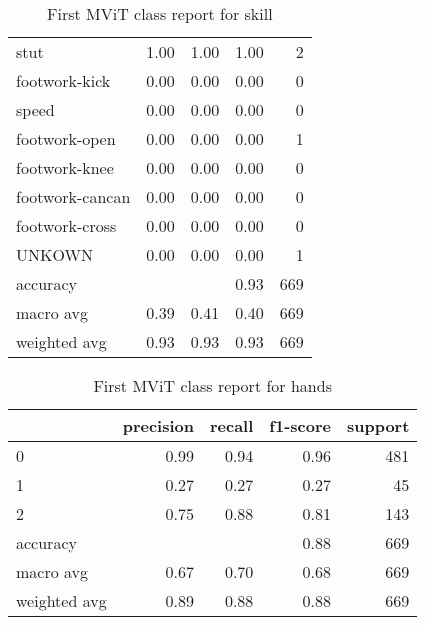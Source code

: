 \begin{table}[h!]
\begin{tabular}{|l|r|r|r|r|}
                stut &      1.00 &     1.00 &     1.00 &        2 \\
       footwork-kick &      0.00 &     0.00 &     0.00 &        0 \\
               speed &      0.00 &     0.00 &     0.00 &        0 \\
       footwork-open &      0.00 &     0.00 &     0.00 &        1 \\
       footwork-knee &      0.00 &     0.00 &     0.00 &        0 \\
     footwork-cancan &      0.00 &     0.00 &     0.00 &        0 \\
      footwork-cross &      0.00 &     0.00 &     0.00 &        0 \\
              UNKOWN &      0.00 &     0.00 &     0.00 &        1 \\
        \hline
            accuracy &           &          &     0.93 &      669 \\
           macro avg &      0.39 &     0.41 &     0.40 &      669 \\
        weighted avg &      0.93 &     0.93 &     0.93 &      669 \\
         \hline
    \end{tabular}
    \caption[Skill class report]{First MViT class report for skill}
    \label{tbl:mvit-first-class-reports-skill}
\end{table}

\begin{table}[h!]
    \begin{tabular}{|l|r|r|r|r|}
                \hline & precision &   recall & f1-score &  support \\ \hline
                0 &      0.99 &     0.94 &     0.96 &      481 \\
                1 &      0.27 &     0.27 &     0.27 &       45 \\
                2 &      0.75 &     0.88 &     0.81 &      143 \\ \hline
         accuracy &           &          &     0.88 &      669 \\
        macro avg &      0.67 &     0.70 &     0.68 &      669 \\
     weighted avg &      0.89 &     0.88 &     0.88 &      669 \\
         \hline
    \end{tabular}
    \caption[Hands class report]{First MViT class report for hands}
    \label{tbl:mvit-first-class-reports-hands}
\end{table}

